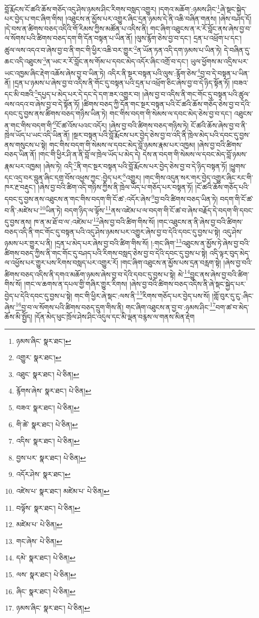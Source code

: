བློ་རྨོངས་ངོ་ཚའི་ཆོས་གཅོད་འདུ་ཤེས་ཉམས་ཤིང་རིགས་བསླད་འགྱུར། །དགའ་མཆོག་:ཉམས་ཤིང་\footnote{ཉམས་ཞིང་  སྣར་ཐང་། }ཞེ་སྡང་སྐྱེད་པར་བྱེད་པ་གང་ཞིག་གིས། །འཐུངས་ན་མྱོས་པར་འགྱུར་ཞིང་དྲན་ཉམས་དེ་ནི་འཆི་བཞིན་གནས། །ཞེས་བཤད་དོ། །དེ་བས་ན་ཚིགས་བཅད་འདིའི་གོ་རིམས་ཀྱིས་མཚོན་པ་འདིས་ནི། གང་ཞིག་འཐུངས་ན་ར་རོ་བློང་ནས་ཞེས་བྱ་བ་ལ་སོགས་པའི་ཚིགས་བཅད་དག་གི་དོན་བསྟན་པ་ཡིན་ནོ། །ལུས་རྙོག་ཅེས་བྱ་བ་དང་། དྲན་པ་འཕྲོག་པ་དང་། ཚུལ་ལས་འདའ་བ་ཞེས་བྱ་བ་ནི་གང་གི་ཕྱིར་འཆི་བར་གྱུར་\footnote{འགྱུར་  སྣར་ཐང་། }ན་ཡོན་ཏན་འདི་དག་ཉམས་པ་ཡིན་ཏེ། དེ་བཞིན་དུ་ཆང་འདི་འཐུངས་\footnote{འཐུང་  སྣར་ཐང་།  པེ་ཅིན། }ན་ཡང་ར་རོ་བློང་ནས་གོམ་པ་དབང་མེད་འདོར་ཞིང་འགྲོ་བ་དང་། ཡུལ་ཕྱོགས་མ་འདྲིས་པར་ཡང་འཁྱམ་ཞིང་རྡེག་འཆོས་ཞེས་བྱ་བ་ཡིན་ཏེ། འདིར་ནི་སྔར་བསྟན་པའི་ལུས་:རྙོག་ཅེས་\footnote{རྙོགས་ཞེས་  སྣར་ཐང་།  པེ་ཅིན། }བྱ་བ་དེ་བསྟན་པ་ཡིན་ནོ། །དྲན་པ་ཉམས་པ་ཞེས་བྱ་བ་འདིས་ནི་གོང་དུ་བསྟན་པའི་དྲན་པ་འཕྲོག་ཅིང་ཞེས་བྱ་བ་དེ་ཉིད་སྟོན་ཏོ། །བཟའ་དང་མི་བཟའི་\footnote{བཟའ་  སྣར་ཐང་།  པེ་ཅིན། }དཔྱད་པ་མེད་པར་དེ་དང་དེ་དག་ཟར་འགྱུར་བ། །ཞེས་བྱ་བ་འདིས་ནི་གང་གོང་དུ་བསྟན་པའི་ཚུལ་ལས་འདའ་བ་ཞེས་བྱ་བ་དེ་སྟོན་ཏོ། །ཚིགས་བཅད་ཀྱི་དོན་གང་སྔར་བསྟན་པའི་ངོ་ཚའི་ཆོས་གཅོད་ཅེས་བྱ་བ་དེའི་དབང་དུ་བྱས་ནས་ཚིགས་བཅད་གཉིས་ཡིན་ཏེ། གང་གིས་བདག་གི་སེམས་ལ་དབང་མེད་ཅེས་བྱ་བ་དང་། འཐུངས་ན་གང་གིས་བདག་གི་\footnote{གི་ཚེ་  སྣར་ཐང་།  པེ་ཅིན། }ངོ་ཚ་འོས་པའང་འདོར། །ཞེས་བྱ་བའི་ཚིགས་བཅད་གཉིས་ཏེ། ངོ་ཚའི་ཆོས་ཞེས་བྱ་བ་ནི་ཁྲེལ་ཡོད་པ་ཡང་འདི་ཡིན་ནོ། །སྔར་བསྟན་པའི་བློ་རྨོངས་པར་བྱེད་ཅེས་བྱ་བ་འདི་ནི་ཁྲེལ་མེད་པའི་དབང་དུ་བྱས་ནས་གསུངས་པ་སྟེ། གང་གིས་བདག་གི་སེམས་ལ་དབང་མེད་བློ་ཉམས་རྣམ་པར་འཁྱམ། །ཞེས་བྱ་བའི་ཚིགས་བཅད་ཡིན་ནོ། །གང་གི་ཕྱིར་ཤི་ན་ནི་བློ་ལ་ཁྲེལ་ཡོད་པ་མེད་དེ། དེས་ན་བདག་གི་སེམས་ལ་དབང་མེད་བློ་ཉམས་རྣམ་པར་འཁྱམ། །ཞེས་ཏེ། འདི་\footnote{འདིས་  སྣར་ཐང་།  པེ་ཅིན། }ནི་གང་སྔར་བསྟན་པའི་བློ་རྨོངས་པར་བྱེད་ཅེས་བྱ་བ་དེ་ཉིད་བསྟན་ཏོ། །ཕྱུགས་དང་འདྲ་བར་བླུན་ཞིང་དགྲ་བོས་འཕྱས་ཀྱང་:བྱེད་པར་\footnote{བྱས་པར་  སྣར་ཐང་།  པེ་ཅིན། }འགྱུར། །གང་གིས་འདུན་སར་གར་བྱེད་འགྱུར་ཞིང་རང་གི་ཁར་རྔ་བརྡུང་། །ཞེས་བྱ་བའི་ཚིག་འདི་གཉིས་ཀྱིས་ནི་ཁྲེལ་ཡོད་པ་གཅོད་པར་བསྟན་ཏོ། །ངོ་ཚའི་ཆོས་གཅོད་པའི་དབང་དུ་བྱས་ནས་འཐུངས་ན་གང་གིས་བདག་གི་ངོ་ཚ་:འདོར་ཞེས་\footnote{འདོར་ཤེས་  སྣར་ཐང་། }བྱ་བའི་ཚིགས་བཅད་ཡིན་ཏེ། བདག་གི་ངོ་ཚ་བ་ནི་:མཛེས་པ་\footnote{འཛེས་པ་  སྣར་ཐང་། མཛེམ་པ་  པེ་ཅིན། }ཡིན་ཏེ། བདག་ཉིད་ལ་ལྟོས་\footnote{བལྟོས་  སྣར་ཐང་།  པེ་ཅིན། }ནས་འཛེམ་པ་ལ་བདག་གི་ངོ་ཚ་བ་ཞེས་བརྗོད་དེ་བདག་གི་དབང་དུ་བྱས་ནས། ཁ་ན་མ་ཐོ་བ་ལ་:འཛེམ་པ་\footnote{མཛེམ་པ་  པེ་ཅིན། }ཞེས་བྱ་བའི་ཚིག་གིས་སོ། །གང་འཐུངས་ན་ནི་ཞེས་བྱ་བའི་ཚིགས་བཅད་འདི་ནི་གང་གོང་དུ་བསྟན་པའི་འདུ་ཤེས་ཉམས་པར་འགྱུར་ཞེས་བྱ་བ་དེའི་དབང་དུ་བྱས་པ་སྟེ། འདུ་ཤེས་ཉམས་པར་གྱུར་པ་ནི། །དྲན་པ་མེད་པར་ཞེས་བྱ་བའི་ཚིག་གིས་སོ། །:གང་ཞིག་\footnote{གང་ཞེས་  པེ་ཅིན། }འཐུངས་ན་མྱོས་ཏེ་ཞེས་བྱ་བའི་ཚིགས་བཅད་ཀྱིས་ནི་གང་གོང་དུ་བཤད་པའི་རིགས་བསླད་ཅེས་བྱ་བ་དེའི་དབང་དུ་བྱས་པ་སྟེ། འདི་ལྟར་བུད་མེད་ལ་འཕྱོས་པར་གྱུར་པས་རིགས་བསླད་པར་འགྱུར་རོ། །གང་ཞིག་འཐུངས་ན་མྱོས་པས་དྲན་བརླག་སྟེ། །ཞེས་བྱ་བའི་ཚིགས་བཅད་འདིས་ནི་དགའ་མཆོག་ཉམས་ཞེས་བྱ་བ་དེའི་དབང་དུ་བྱས་པ་སྟེ། མེ་\footnote{དམེ་  སྣར་ཐང་།  པེ་ཅིན། }བྱུང་ནས་ཞེས་བྱ་བའི་ཚིག་གིས་སོ། །གང་ལ་ཆགས་ན་དཔལ་གྱི་གཞིར་གྱུར་རིགས། །ཞེས་བྱ་བའི་ཚིགས་བཅད་འདིས་ནི་ཞེ་སྡང་སྐྱེད་པར་བྱེད་པ་དེའི་དབང་དུ་བྱས་པ་སྟེ། གང་གི་ཕྱིར་ཞེ་སྡང་:ལས་ནི་\footnote{ལས་  སྣར་ཐང་།  པེ་ཅིན། }རིགས་གཅོད་པར་བྱེད་པས་སོ། །གློ་བུར་དུ་ངུ་:ཞིང་ཞེས་\footnote{ཞིང་  སྣར་ཐང་།  པེ་ཅིན། }བྱ་བ་ལ་སོགས་པའི་ཚིགས་བཅད་དྲུག་གིས་ནི། གང་ཞིག་འཐུངས་ན་བྱ་བ་:ཉམས་ཤིང་\footnote{ཉམས་ཞིང་  སྣར་ཐང་།  པེ་ཅིན། }བག་ཚ་བ་མེད་ཆོས་མི་སྤྱོད། །དོན་མེད་ཕུང་ཁྲོལ་ཤེས་ཤིང་འདུལ་དང་མི་ལྡན་བརྙས་ལ་གནས་མིན་རྡེག 